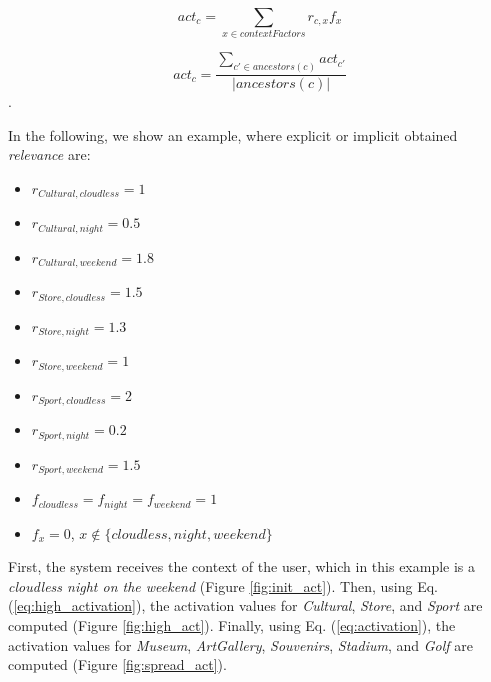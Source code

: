 \begin{equation} \label{eq:high_activation}
    act_c = \sum_{x \in contextFactors} r_{c,x} f_x
\end{equation}


\begin{equation} \label{eq:activation}
    act_c = \frac{\displaystyle \sum_{c' \in ancestors(c)} act_{c'}}{|ancestors(c)|}
\end{equation}.

In the following, we show an example, where explicit or implicit obtained \textit{relevance} are:

\begin{itemize}
    \item $r_{Cultural, cloudless} = 1$
    \item $r_{Cultural, night} = 0.5$
    \item $r_{Cultural, weekend} = 1.8$
    \item $r_{Store, cloudless} = 1.5$
    \item $r_{Store, night} = 1.3$
    \item $r_{Store, weekend} = 1$
    \item $r_{Sport, cloudless} = 2$
    \item $r_{Sport, night} = 0.2$
    \item $r_{Sport, weekend} = 1.5$
    \item $f_{cloudless} = f_{night} = f_{weekend} = 1$
    \item $f_x = 0$, $x \notin \{cloudless, night, weekend\}$
\end{itemize}

First, the system receives the context of the user, which in this example is a {\it cloudless night on the weekend} (Figure \ref{fig:init_act}). Then, using Eq. (\ref{eq:high_activation}), the activation values for \textit{Cultural}, \textit{Store}, and \textit{Sport} are computed (Figure \ref{fig:high_act}). Finally, using Eq. (\ref{eq:activation}), the activation values for \textit{Museum}, \textit{ArtGallery}, \textit{Souvenirs}, \textit{Stadium}, and \textit{Golf} are computed (Figure \ref{fig:spread_act}).

